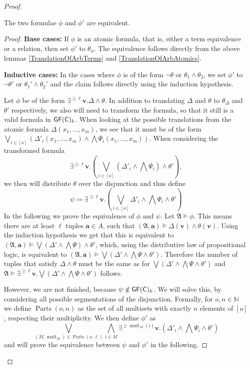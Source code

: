 \begin{proof}
	\begin{claim}
		The two formulae $\phi$ and $\phi'$ are equivalent.
	\end{claim}
	\begin{proof}
		\textbf{Base cases:}
		If $\phi$ is an atomic formula, that is, either a term equivalence or a relation, then set $\phi'$ to $\theta_\phi$.
		The equivalence follows directly from the above lemmas \ref{TranslationOfArbTerms} and \ref{TranslationOfArbAtomics}.
		
		\textbf{Inductive cases:}
		In the cases where $\phi$ is of the form $\neg\theta$ or $\theta_1\land\theta_2$, we set $\phi'$ to $\neg\theta'$ or $\theta_1'\land\theta_2'$ and the claim follows directly using the induction hypothesis.
		
		Let $\phi$ be of the form $\exists^{\geq\ell}\mathbf v. \Delta\land \theta$.
		In addition to translating $\Delta$ and $\theta$ to $\theta_\Delta$ and $\theta'$ respectively, we also will need to transform the formula, so that it still is a valid formula in $\mathsf{GF}(\mathsf{C})_k$.
		When looking at the possible translations from the atomic formula $\Delta(x_1,\dots,x_m)$, we see that it must be of the form $\bigvee_{i\in[o]} (\Delta'_i(x_1,\dots,x_m) \land \bigwedge \Psi_i(x_1,\dots,x_m))$.
		When considering the transformed formula 
		$$\exists^{\geq \ell}\mathbf v. \left(\bigvee_{i\in [o]}(\Delta'_i\land\bigwedge \Psi_i) \land \theta'\right),$$
		we then will distribute $\theta$ over the disjunction and thus define
		$$\psi \coloneqq \exists^{\geq \ell}\mathbf v. \left(\bigvee_{i\in[o]} \Delta'_i\land\bigwedge \Psi_i \land \theta'\right)$$
		In the following we prove the equivalence of $\phi$ and $\psi$.
		Let $\mathfrak A\models \phi$.
		This means there are at least $\ell$ tuples $\mathbf a\in A$, such that $(\mathfrak A,\mathbf a)\models \Delta(\mathbf v) \land \theta(\mathbf v)$.
		Using the induction hypothesis we get that this is equivalent to $(\mathfrak A,\mathbf a)\models \bigvee(\Delta'\land\bigwedge\Psi)\land \theta'$, which, using the distributive law of propositional logic, is equivalent to $(\mathfrak A,\mathbf a)\models \bigvee(\Delta'\land\bigwedge\Psi\land\theta')$.
		Therefore the number of tuples that satisfy $\Delta\land\theta$ must be the same as for $\bigvee(\Delta'\land\bigwedge\Psi\land\theta')$ and $\mathfrak A\models \exists^{\geq\ell}\mathbf v. \bigvee (\Delta'\land\bigwedge\Psi\land\theta')$ follows.
		
		However, we are not finished, because $\psi \notin \mathsf{GF}(\mathsf{C})_k$.
		We will solve this, by considering all possible segmentations of the disjunction.
		Formally, for $o,n\in\mathbb N$ we define $\operatorname{Parts}(o, n)$ as the set of all multisets with exactly $n$ elements of $[o]$, respecting their multiplicity.
		We then define $\phi'$ as
		$$\bigvee_{(M,\operatorname{mult}_M)\in \operatorname{Parts}(o,\ell)} \bigwedge_{i\in M} \exists^{\geq \operatorname{mult}_M(i)}\mathbf v. (\Delta'_i\land\bigwedge \Psi_i \land \theta')$$
		and will prove the equivalence between $\psi$ and $\phi'$ in the following. 
		

\end{proof}
\end{proof}
